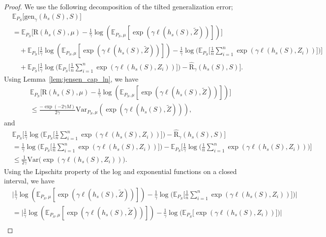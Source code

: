 \documentclass{article}
\theoremstyle{plain}
\theoremstyle{plain}
\theoremstyle{definition}
\theoremstyle{remark}
\newcommand{\var}{\mathrm{Var}}
\newcommand{\RTERM}{\widehat{\mathrm{R}}_{\gamma}}
\newcommand{\RTrue}{\mathrm{R}}
\newcommand{\mbE}{\mathbb{E}}
\begin{document}
\begin{proof}
We use the following decomposition of the tilted generalization error;
   \begin{equation}\label{eq: gen decom stable}
    \begin{split}
&\mbE_{P_S}\big[\mathrm{gen}_{\gamma}(h_s(S),S)\big]\\&= \mbE_{P_S}\big[ \RTrue(h_s(S),\mu)- \frac{1}{\gamma}\log(\mbE_{P_S,\mu}[\exp(\gamma \ell(h_s(S),\tilde Z))])\big]
\\&\quad+\mbE_{P_S}\bigg[\frac{1}{\gamma}\log(\mbE_{P_S,\mu}[\exp(\gamma \ell(h_s(S),\tilde Z))]) -\frac{1}{\gamma}\log\Big(\mbE_{P_S}\Big[\frac{1}{n}\sum_{i=1}^n\exp(\gamma \ell(h_s(S),Z_i))\Big]\Big)\bigg]\\
&\quad + \mbE_{P_S}\bigg[\frac{1}{\gamma}\log\Big(\mbE_{P_S}\Big[\frac{1}{n}\sum_{i=1}^n\exp(\gamma \ell(h_s(S),Z_i))\Big]\Big) -\RTERM(h_s(S),S)\bigg].
    \end{split}
\end{equation}
Using Lemma~\ref{lem:jensen_cap_ln}, we have 
\[\begin{split}&\mbE_{P_S}\big[ \RTrue(h_s(S),\mu)- \frac{1}{\gamma}\log(\mbE_{P_S,\mu}[\exp(\gamma \ell(h_s(S),\tilde Z))])\big]\\&\leq \frac{-\exp(-2\gamma M)}{2\gamma}\var_{P_S,\mu}(\exp(\gamma\ell(h_s(S),\tilde{Z}))),
\end{split}\]
and
\[\begin{split}
&\mbE_{P_S}\bigg[\frac{1}{\gamma}\log\Big(\mbE_{P_S}\Big[\frac{1}{n}\sum_{i=1}^n\exp(\gamma \ell(h_s(S),Z_i))\Big]\Big) -\RTERM(h_s(S),S)\bigg]\\ 
&=\frac{1}{\gamma}\log\Big(\mbE_{P_S}\Big[\frac{1}{n}\sum_{i=1}^n\exp(\gamma \ell(h_s(S),Z_i))\Big]\Big) -\mbE_{P_S}\bigg[\frac{1}{\gamma}\log\Big(\frac{1}{n}\sum_{i=1}^n\exp(\gamma \ell(h_s(S),Z_i))\Big)\bigg]\\
&\leq \frac{1}{2\gamma}\var\big(\exp(\gamma\ell(h_s(S),Z_i))\big).
\end{split}\]
Using the Lipschitz property of the log and exponential functions on a closed interval, we have 
\[\begin{split}
    &\Big|\frac{1}{\gamma}\log(\mbE_{P_S,\mu}[\exp(\gamma \ell(h_s(S),\tilde Z))]) -\frac{1}{\gamma}\log\Big(\mbE_{P_S}\Big[\frac{1}{n}\sum_{i=1}^n\exp(\gamma \ell(h_s(S),Z_i))\Big]\Big)\Big|\\
    &=\Big|\frac{1}{\gamma}\log(\mbE_{P_S,\mu}[\exp(\gamma \ell(h_s(S),\tilde Z))]) -\frac{1}{\gamma}\log\Big(\mbE_{P_S}\Big[\exp(\gamma \ell(h_s(S),Z_i))\Big]\Big)\Big|\\

\end{split}\]
\end{proof}
\end{document}
